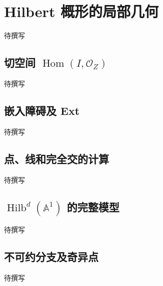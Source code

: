 
% 
% 

\section{Hilbert 概形的局部几何}
\label{g5:sec:3303}

待撰写

\subsection{\texorpdfstring{切空间 \(\operatorname{Hom}(I,\mathcal O_Z)\)}{切空间 Hom(I,O\_Z)}}
\label{g5:subsec:3303:01}
待撰写

\subsection{嵌入障碍及 Ext}
\label{g5:subsec:3303:02}
待撰写

\subsection{点、线和完全交的计算}
\label{g5:subsec:3303:03}
待撰写

\subsection{\texorpdfstring{\(\operatorname{Hilb}^d(\mathbb A^1)\) 的完整模型}{Hilbᵈ(A¹) 的完整模型}}
\label{g5:subsec:3303:04}
待撰写

\subsection{不可约分支及奇异点}
\label{g5:subsec:3303:05}
待撰写
